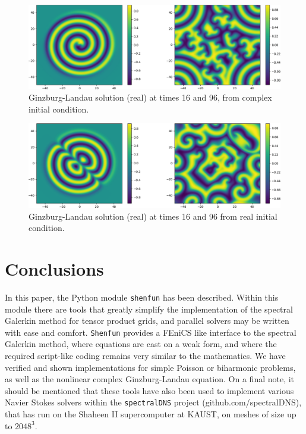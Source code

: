 \documentclass[%
oneside,                 %
final,                   %
10pt]{article}
\theoremstyle{definition}
\begin{document}
\begin{figure}[!ht]  %
  \centerline{\includegraphics[width=0.9\linewidth]{figs/Ginzburg_1.png}}
  \caption{
  Ginzburg-Landau solution (real) at times 16 and 96, from complex initial condition. \label{fig:GL1}
  }
\end{figure}



\begin{figure}[!ht]  %
  \centerline{\includegraphics[width=0.9\linewidth]{figs/Ginzburg.png}}
  \caption{
  Ginzburg-Landau solution (real) at times 16 and 96 from real initial condition. \label{fig:GL2}
  }
\end{figure}


\section{Conclusions}
In this paper, the Python module \texttt{shenfun} has been described. Within this module there are tools that greatly simplify the implementation of the spectral Galerkin method for tensor product grids, and parallel solvers may be written with ease and comfort.  \texttt{Shenfun} provides a FEniCS like interface to the spectral Galerkin method, where equations are cast on a weak form, and where the required script-like coding remains very similar to the mathematics. We have verified and shown implementations for simple Poisson or biharmonic problems, as well as the nonlinear complex Ginzburg-Landau equation. On a final note, it  should be mentioned that these tools have also been used to implement various Navier Stokes solvers within the \texttt{spectralDNS} project (github.com/spectralDNS), that has run on the Shaheen II supercomputer at KAUST, on meshes of size up to $2048^3$.
\end{document}
